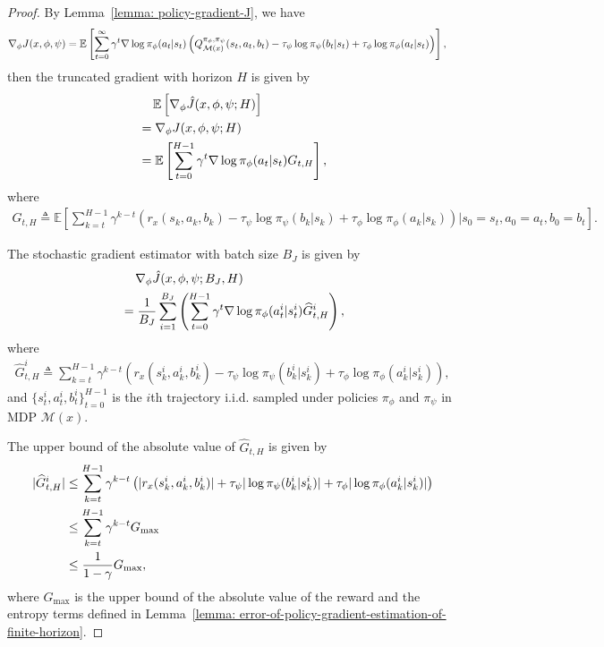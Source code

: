 \documentclass{article}
\theoremstyle{plain}
\theoremstyle{definition}
\theoremstyle{remark}
\def\E{\mathbb E}
\def\cM{\mathcal M}
\def\bydef{\triangleq}
\begin{document}
\begin{proof}
    By Lemma~\ref{lemma: policy-gradient-J}, we have
    \begin{align}
        \nabla_\phi J(x,\phi,\psi) & = \E  \left[\sum_{t=0}^{\infty} \gamma^t \nabla \log \pi_\phi(a_t|s_t) \left( Q^{\pi_\phi,\pi_\psi}_{\cM(x)}(s_t,a_t,b_t) - \tau_\psi \log \pi_\psi(b_t|s_t) + \tau_\phi \log \pi_\phi(a_t|s_t) \right) \right], \notag
    \end{align}
    then the truncated gradient with horizon $H$ is given by
    \begin{align}
        & \quad \, \E \left[ \nabla_\phi \hat{J}(x,\phi,\psi;H) \right]  \notag \\
        & = \nabla_\phi J(x,\phi,\psi;H) \notag \\
        & = \E  \left[\sum_{t=0}^{H-1} \gamma^t \nabla \log \pi_\phi(a_t|s_t) G_{t,H} \right], 
    \end{align}
    where 
    \begin{align}
        G_{t,H} \bydef \E \left[\sum_{k=t}^{H-1} \gamma^{k-t} \left( r_x(s_k,a_k,b_k) - \tau_\psi \log \pi_\psi(b_k|s_k) + \tau_\phi \log \pi_\phi(a_k|s_k) \right) \bigg| s_0 = s_t,a_0 = a_t,b_0 = b_t   \right].
    \end{align}

    The stochastic gradient estimator with batch size $B_J$ is given by
    \begin{align}
        & \quad \, \nabla_\phi \hat{J}(x,\phi,\psi;B_J,H) \notag\\
        & = \frac{1}{B_J} \sum_{i=1}^{B_J} \left( \sum_{t=0}^{H-1} \gamma^t \nabla \log \pi_\phi(a_t^i|s_t^i) \widehat{G}_{t,H}^i \right),
    \end{align}
    where 
    \begin{gather}
        \widehat{G}_{t,H}^i \bydef \sum_{k=t}^{H-1} \gamma^{k-t} \left( r_x(s_k^i,a_k^i,b_k^i) - \tau_\psi \log \pi_\psi(b_k^i|s_k^i) + \tau_\phi \log \pi_\phi(a_k^i|s_k^i) \right),
    \end{gather}
    and $\{s_t^i, a_t^i,b_t^i\}_{t=0}^{H-1}$ is the $i$th trajectory i.i.d. sampled under policies $\pi_\phi$ and $\pi_\psi$ in MDP $\cM(x)$.

    The upper bound of the absolute value of $\widehat{G}_{t,H}$ is given by
    \begin{align}
        |\widehat{G}_{t,H}^i| & \leq \sum_{k=t}^{H-1} \gamma^{k-t} \left( |r_x(s_k^i,a_k^i,b_k^i)| + \tau_\psi |\log \pi_\psi(b_k^i|s_k^i)| + \tau_\phi |\log \pi_\phi(a_k^i|s_k^i)| \right)\notag  \\
        & \leq \sum_{k=t}^{H-1} \gamma^{k-t} G_{\max} \notag \\
        & \leq \frac{1}{1-\gamma} G_{\max},
    \end{align}
    where $G_{\max}$ is the upper bound of the absolute value of the reward and the entropy terms defined in Lemma~\ref{lemma: error-of-policy-gradient-estimation-of-finite-horizon}.


\end{proof}
\end{document}
